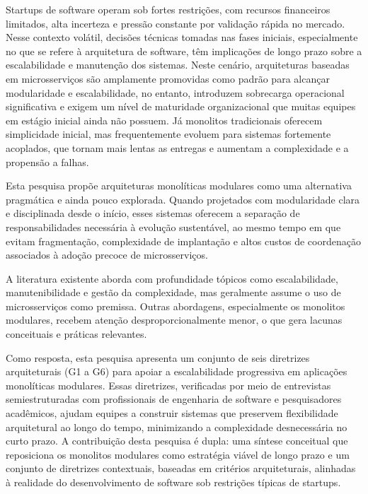 Startups de software operam sob fortes restrições, com recursos financeiros limitados, alta incerteza e pressão constante por validação rápida no mercado. Nesse contexto volátil, decisões técnicas tomadas nas fases iniciais, especialmente no que se refere à arquitetura de software, têm implicações de longo prazo sobre a escalabilidade e manutenção dos sistemas. Neste cenário, arquiteturas baseadas em microsserviços são amplamente promovidas como padrão para alcançar modularidade e escalabilidade, no entanto, introduzem sobrecarga operacional significativa e exigem um nível de maturidade organizacional que muitas equipes em estágio inicial ainda não possuem. Já monolitos tradicionais oferecem simplicidade inicial, mas frequentemente evoluem para sistemas fortemente acoplados, que tornam mais lentas as entregas e aumentam a complexidade e a propensão a falhas.

Esta pesquisa propõe arquiteturas monolíticas modulares como uma alternativa pragmática e ainda pouco explorada. Quando projetados com modularidade clara e disciplinada desde o início, esses sistemas oferecem a separação de responsabilidades necessária à evolução sustentável, ao mesmo tempo em que evitam fragmentação, complexidade de implantação e altos custos de coordenação associados à adoção precoce de microsserviços.

A literatura existente aborda com profundidade tópicos como escalabilidade, manutenibilidade e gestão da complexidade, mas geralmente assume o uso de microsserviços como premissa. Outras abordagens, especialmente os monolitos modulares, recebem atenção desproporcionalmente menor, o que gera lacunas conceituais e práticas relevantes.

Como resposta, esta pesquisa apresenta um conjunto de seis diretrizes arquiteturais (G1 a G6) para apoiar a escalabilidade progressiva em aplicações monolíticas modulares. Essas diretrizes, verificadas por meio de entrevistas semiestruturadas com profissionais de engenharia de software e pesquisadores acadêmicos, ajudam equipes a construir sistemas que preservem flexibilidade arquitetural ao longo do tempo, minimizando a complexidade desnecessária no curto prazo. A contribuição desta pesquisa é dupla: uma síntese conceitual que reposiciona os monolitos modulares como estratégia viável de longo prazo e um conjunto de diretrizes contextuais, baseadas em critérios arquiteturais, alinhadas à realidade do desenvolvimento de software sob restrições típicas de startups.
